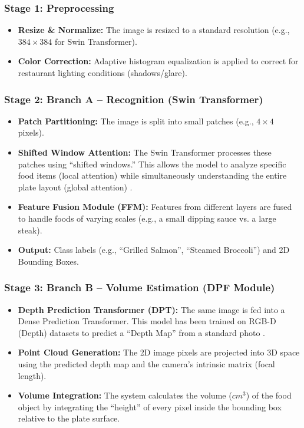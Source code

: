 \documentclass[fleqn,10pt]{SelfArx} %
\begin{document}
\subsubsection{Stage 1: Preprocessing}

\begin{itemize}[noitemsep]
    \item \textbf{Resize \& Normalize:} The image is resized to a standard resolution (e.g., $384 \times 384$ for Swin Transformer).
    \item \textbf{Color Correction:} Adaptive histogram equalization is applied to correct for restaurant lighting conditions (shadows/glare).
\end{itemize}

\subsubsection{Stage 2: Branch A -- Recognition (Swin Transformer)}

\begin{itemize}[noitemsep]
    \item \textbf{Patch Partitioning:} The image is split into small patches (e.g., $4 \times 4$ pixels).
    \item \textbf{Shifted Window Attention:} The Swin Transformer processes these patches using ``shifted windows.'' This allows the model to analyze specific food items (local attention) while simultaneously understanding the entire plate layout (global attention) \cite{wang2024swin}.
    \item \textbf{Feature Fusion Module (FFM):} Features from different layers are fused to handle foods of varying scales (e.g., a small dipping sauce vs. a large steak).
    \item \textbf{Output:} Class labels (e.g., ``Grilled Salmon'', ``Steamed Broccoli'') and 2D Bounding Boxes.
\end{itemize}

\subsubsection{Stage 3: Branch B -- Volume Estimation (DPF Module)}

\begin{itemize}[noitemsep]
    \item \textbf{Depth Prediction Transformer (DPT):} The same image is fed into a Dense Prediction Transformer. This model has been trained on RGB-D (Depth) datasets to predict a ``Depth Map'' from a standard photo \cite{han2023dpf}.
    \item \textbf{Point Cloud Generation:} The 2D image pixels are projected into 3D space using the predicted depth map and the camera's intrinsic matrix (focal length).
    \item \textbf{Volume Integration:} The system calculates the volume ($cm^3$) of the food object by integrating the ``height'' of every pixel inside the bounding box relative to the plate surface.
\end{itemize}
\end{document}
